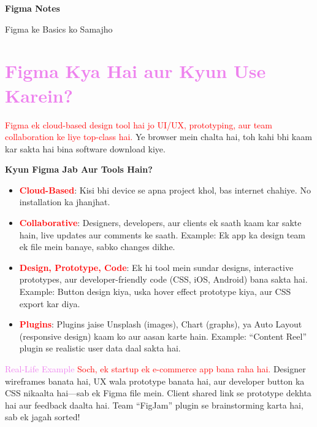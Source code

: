 \documentclass[a4paper]{article}
\begin{document}
\begin{titlepage}
  \centering
  \vspace*{\fill}
  {\Huge\bfseries\color{warningred} Figma Notes}\par
  \vspace{1cm}
  {\Large\color{violet} Figma ke Basics ko Samajho}\par
  \vspace*{\fill}
\end{titlepage}

\section*{\textbf{\LARGE \textcolor{violet}{Figma Kya Hai aur Kyun Use Karein?}}}
\textcolor{red}{Figma ek cloud-based design tool hai jo UI/UX, prototyping, aur team collaboration ke liye top-class hai.} Ye browser mein chalta hai, toh kahi bhi kaam kar sakta hai bina software download kiye.

\textbf{\textcolor{warningred}{Kyun Figma Jab Aur Tools Hain?}}
\begin{itemize}
  \item \textbf{\textcolor{red}{Cloud-Based}}: \textcolor{examplegreen}{Kisi bhi device se apna project khol, bas internet chahiye. No installation ka jhanjhat.}
  \item \textbf{\textcolor{red}{Collaborative}}: \textcolor{examplegreen}{Designers, developers, aur clients ek saath kaam kar sakte hain, live updates aur comments ke saath.} Example: Ek app ka design team ek file mein banaye, sabko changes dikhe.
  \item \textbf{\textcolor{red}{Design, Prototype, Code}}: \textcolor{examplegreen}{Ek hi tool mein sundar designs, interactive prototypes, aur developer-friendly code (CSS, iOS, Android) bana sakta hai.} Example: Button design kiya, uska hover effect prototype kiya, aur CSS export kar diya.
  \item \textbf{\textcolor{red}{Plugins}}: \textcolor{examplegreen}{Plugins jaise Unsplash (images), Chart (graphs), ya Auto Layout (responsive design) kaam ko aur aasan karte hain.} Example: “Content Reel” plugin se realistic user data daal sakta hai.
\end{itemize}

\begin{examplebox}{\textcolor{violet}{Real-Life Example}}
\textcolor{red}{Soch, ek startup ek e-commerce app bana raha hai.} Designer wireframes banata hai, UX wala prototype banata hai, aur developer button ka CSS nikaalta hai—sab ek Figma file mein. \textcolor{examplegreen}{Client shared link se prototype dekhta hai aur feedback daalta hai.} Team “FigJam” plugin se brainstorming karta hai, sab ek jagah sorted!
\end{examplebox}
\end{document}
